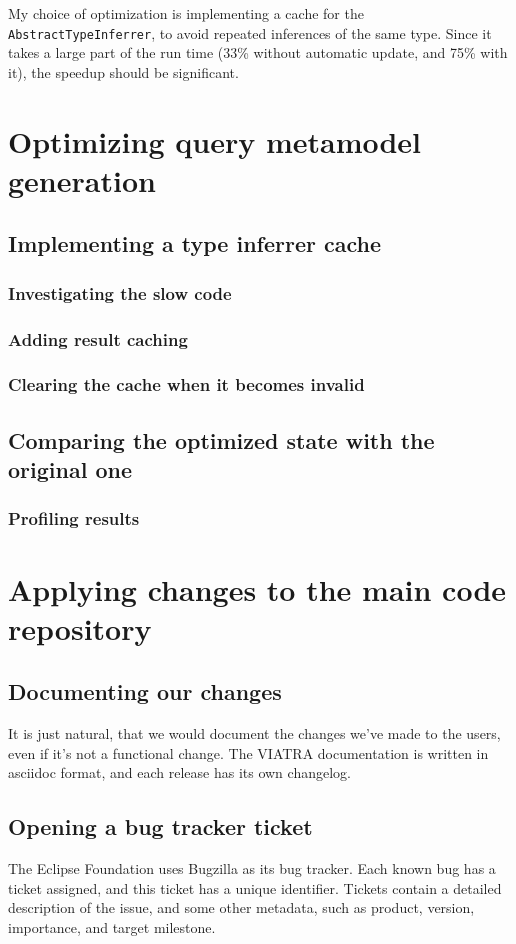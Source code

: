 \documentclass[11pt,a4paper,oneside]{report}
\begin{document}
My choice of optimization is implementing a cache for the
\texttt{AbstractTypeInferrer}, to avoid repeated inferences of the same type.
Since it takes a large part of the run time (33\% without automatic update,
and 75\% with it), the speedup should be significant.

\chapter{Optimizing query metamodel generation}
\section{Implementing a type inferrer cache}
\subsection{Investigating the slow code}
\subsection{Adding result caching}
\subsection{Clearing the cache when it becomes invalid}
\section{Comparing the optimized state with the original one}
\subsection{Profiling results}

\chapter{Applying changes to the main code repository}
\section{Documenting our changes}
It is just natural, that we would document the changes we've made to the users,
even if it's not a functional change. The VIATRA documentation is written in
asciidoc format, and each release has its own changelog.

\section{Opening a bug tracker ticket}
The Eclipse Foundation uses Bugzilla as its bug tracker. Each known bug has a
ticket assigned, and this ticket has a unique identifier. Tickets contain
a detailed description of the issue, and some other metadata, such as product,
version, importance, and target milestone.
\end{document}
